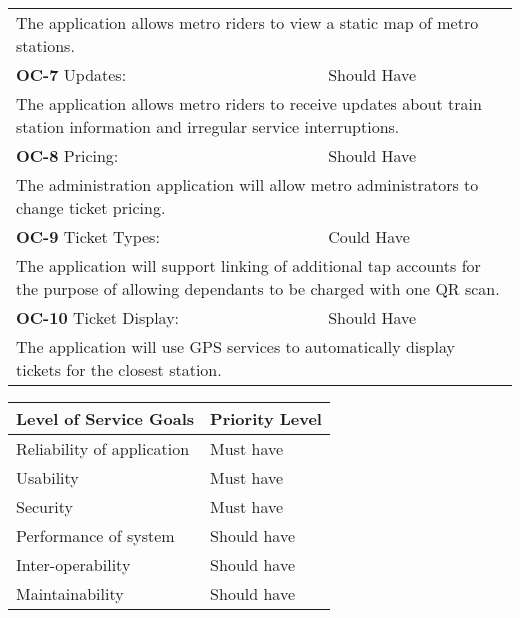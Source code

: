\begin{table}[h]
\begin{tabularx}{\textwidth}{Xl}
\multicolumn{2}{X}{The application allows metro riders to view a static map of metro stations.}                                                                         \\
\textbf{OC-7} Updates:                                                                                & Should Have                                                              \\
\multicolumn{2}{X}{The application allows metro riders to receive updates about train station information and irregular service interruptions.}                         \\
\textbf{OC-8} Pricing:                                                                                & Should Have                                                              \\
\multicolumn{2}{X}{The administration application will allow metro administrators to change ticket pricing.}                                                            \\
\textbf{OC-9} Ticket Types:                                                                           & Could Have                                                               \\
\multicolumn{2}{X}{The application will support linking of additional tap accounts for the purpose of allowing dependants to be charged with one QR scan.}              \\
\textbf{OC-10} Ticket Display:                                                                        & Should Have                                                              \\
\multicolumn{2}{X}{The application will use GPS services to automatically display tickets for the closest station.}           \\
\bottomrule                                         
\end{tabularx}
\end{table}

\begin{table}[h]
\centering
\begin{tabular}{@{}ll@{}}
\toprule
Level of Service Goals     & Priority Level \\ \midrule
Reliability of application & Must have      \\
Usability                  & Must have      \\
Security                   & Must have      \\
Performance of system      & Should have    \\
Inter-operability          & Should have    \\
Maintainability            & Should have   \\
\bottomrule
\end{tabular}
\end{table}